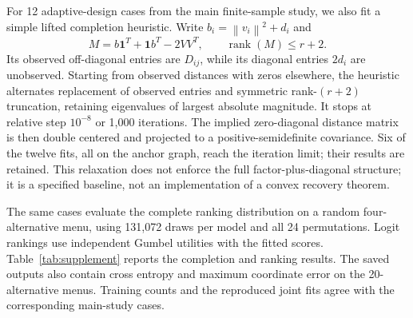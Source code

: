 \documentclass[11pt]{amsart}
\theoremstyle{definition}\newtheorem{example}[theorem]{Example}
\theoremstyle{remark}\newtheorem{remark}[theorem]{Remark}
\newcommand{\one}{\mathbf 1}\newcommand{\diag}{\operatorname{diag}}
\newcommand{\rank}{\operatorname{rank}}\newcommand{\TV}{\operatorname{TV}}
\newcommand{\norm}[1]{\left\lVert#1\right\rVert}
\begin{document}
For 12 adaptive-design cases from the main finite-sample study, we also fit a simple lifted completion heuristic. Write $b_i=\norm{v_i}^2+d_i$ and
\[
 M=b\one^T+\one b^T-2VV^T,\qquad \rank(M)\leq r+2.
\]
Its observed off-diagonal entries are $D_{ij}$, while its diagonal entries $2d_i$ are unobserved. Starting from observed distances with zeros elsewhere, the heuristic alternates replacement of observed entries and symmetric rank-$(r+2)$ truncation, retaining eigenvalues of largest absolute magnitude. It stops at relative step $10^{-8}$ or 1,000 iterations. The implied zero-diagonal distance matrix is then double centered and projected to a positive-semidefinite covariance. Six of the twelve fits, all on the anchor graph, reach the iteration limit; their results are retained. This relaxation does not enforce the full factor-plus-diagonal structure; it is a specified baseline, not an implementation of a convex recovery theorem.

The same cases evaluate the complete ranking distribution on a random four-alternative menu, using 131,072 draws per model and all 24 permutations. Logit rankings use independent Gumbel utilities with the fitted scores. Table~\ref{tab:supplement} reports the completion and ranking results. The saved outputs also contain cross entropy and maximum coordinate error on the 20-alternative menus. Training counts and the reproduced joint fits agree with the corresponding main-study cases.
\begin{table}[htbp]\centering\scriptsize

\caption{Supplementary three-seed means. Lifted columns give relative covariance error and 20-alternative total variation. Ranking columns give four-alternative total variation; MC rank compares two independent draws from the true model.}\label{tab:supplement}
\end{table}
\end{document}

